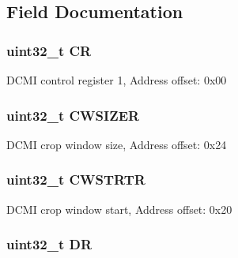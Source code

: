\subsection{Field Documentation}
\hypertarget{struct_d_c_m_i___type_def_ab40c89c59391aaa9d9a8ec011dd0907a}{
\subsubsection[{C\-R}]{ uint32\-\_\-t C\-R}}\label{struct_d_c_m_i___type_def_ab40c89c59391aaa9d9a8ec011dd0907a}
D\-C\-M\-I control register 1, Address offset\-: 0x00 \hypertarget{struct_d_c_m_i___type_def_aa3ccc5d081bbee3c61ae9aa5e0c83af9}{
\subsubsection[{C\-W\-S\-I\-Z\-E\-R}]{ uint32\-\_\-t C\-W\-S\-I\-Z\-E\-R}}\label{struct_d_c_m_i___type_def_aa3ccc5d081bbee3c61ae9aa5e0c83af9}
D\-C\-M\-I crop window size, Address offset\-: 0x24 \hypertarget{struct_d_c_m_i___type_def_a919b70dd8762e44263a02dfbafc7b8ce}{
\subsubsection[{C\-W\-S\-T\-R\-T\-R}]{ uint32\-\_\-t C\-W\-S\-T\-R\-T\-R}}\label{struct_d_c_m_i___type_def_a919b70dd8762e44263a02dfbafc7b8ce}
D\-C\-M\-I crop window start, Address offset\-: 0x20 \hypertarget{struct_d_c_m_i___type_def_a3df0d8dfcd1ec958659ffe21eb64fa94}{
\subsubsection[{D\-R}]{ uint32\-\_\-t D\-R}}\label{struct_d_c_m_i___type_def_a3df0d8dfcd1ec958659ffe21eb64fa94}
